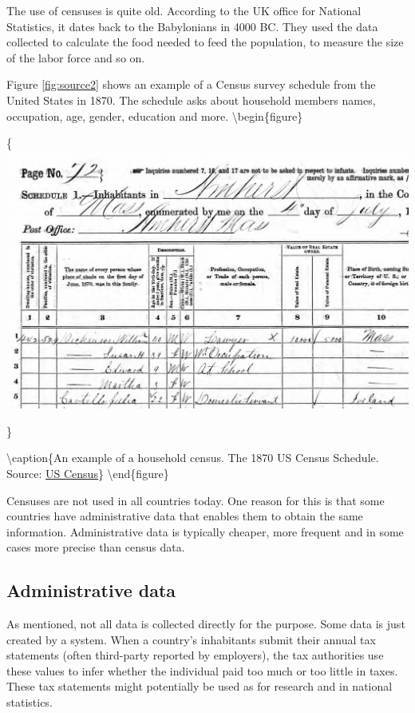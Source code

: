 \documentclass[]{book}
\begin{document}
The use of censuses is quite old. According to the UK office for National Statistics, it dates back to the Babylonians in 4000 BC. They used the data collected to calculate the food needed to feed the population, to measure the size of the labor force and so on.

Figure \ref{fig:source2} shows an example of a Census survey schedule from the United States in 1870. The schedule asks about household members names, occupation, age, gender, education and more.
\textbackslash begin\{figure\}

\{\centering \includegraphics[width=0.9\linewidth]{_resources/chapter_sources/fig_census}

\}

\textbackslash caption\{An example of a household census. The 1870 US Census Schedule. Source: \href{https://www.census.gov/history/www/through_the_decades/questionnaires/1870_2.html}{US Census}\}\label{fig:source2}
\textbackslash end\{figure\}

Censuses are not used in all countries today. One reason for this is that some countries have administrative data that enables them to obtain the same information. Administrative data is typically cheaper, more frequent and in some cases more precise than census data.

\hypertarget{administrative-data}{%
\subsection{Administrative data}\label{administrative-data}}

As mentioned, not all data is collected directly for the purpose. Some data is just created by a system. When a country's inhabitants submit their annual tax statements (often third-party reported by employers), the tax authorities use these values to infer whether the individual paid too much or too little in taxes. These tax statements might potentially be used as for research and in national statistics.
\end{document}
